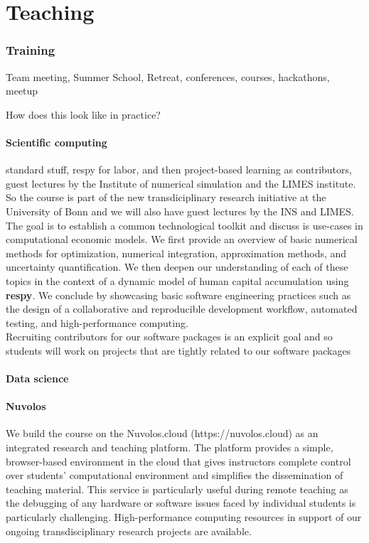 \section{Teaching}

\subsubsection*{Training} Team meeting, Summer School, Retreat, conferences, courses, hackathons, meetup


How does this look like in practice?

\paragraph{Scientific computing} standard stuff, respy for labor, and then project-based learning as contributors, guest lectures by the Institute of numerical simulation and the LIMES institute. So the course is part of the new transdiciplinary research initiative at the University of Bonn and we will also have guest lectures by the INS and LIMES. The goal is to establish a common technological toolkit and discuss is use-cases in computational economic models. We first provide an overview of basic numerical methods for optimization, numerical integration, approximation methods, and uncertainty quantification. We then deepen our understanding of each of these topics in the context of a dynamic model of human capital accumulation using \textbf{respy}. We conclude by showcasing basic software engineering practices such as the design of a collaborative and reproducible development workflow, automated testing, and high-performance computing.\\

\noindent Recruiting contributors for our software packages is an explicit goal and so students will work on projects that are tightly related to our software packages

\paragraph{Data science}

\paragraph{Nuvolos} We build the course on the Nuvolos.cloud (https://nuvolos.cloud) as an integrated research and teaching platform. The platform provides a simple, browser-based environment in the cloud that gives instructors complete control over students’ computational environment and simplifies the dissemination of teaching material. This service is particularly useful during remote teaching as the debugging of any hardware or software issues faced by individual students is particularly challenging. High-performance computing resources in support of our ongoing transdisciplinary research projects are available.

